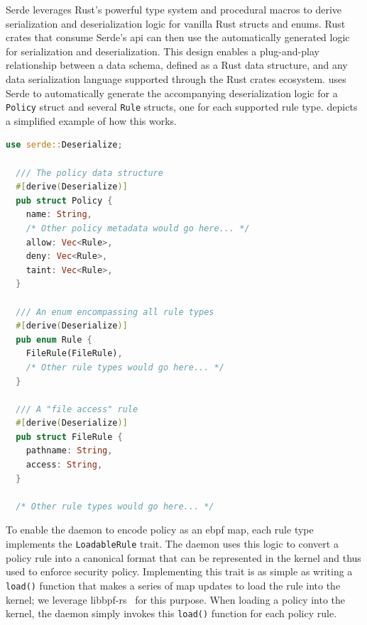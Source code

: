 Serde leverages Rust's powerful type system and procedural macros to derive serialization
and deserialization logic for vanilla Rust structs and enums. Rust crates that consume
Serde's \gls{api} can then use the automatically generated logic for serialization and
deserialization. This design enables a plug-and-play relationship between a data schema,
defined as a Rust data structure, and any data serialization language supported through the
Rust crates ecosystem. \bpfcontain{} uses Serde to automatically generate the accompanying
deserialization logic for a \texttt{Policy} struct and several \texttt{Rule} structs, one
for each supported rule type.  depicts a simplified example of
how this works.

\begin{lstlisting}[language=Rust, gobble=2, caption={[A simplified example of \bpfcontain{}'s policy deserialization logic]
  A simplified example of \bpfcontain{}'s policy deserialization logic. Policy rules are
  specified declaratively using Rust structs and the corresponding deserialization logic
  is automatically generated by the Serde crate using a simple decorator macro.
},
label={lst:bpfcontain-serde}]
  use serde::Deserialize;

  /// The policy data structure
  #[derive(Deserialize)]
  pub struct Policy {
    name: String,
    /* Other policy metadata would go here... */
    allow: Vec<Rule>,
    deny: Vec<Rule>,
    taint: Vec<Rule>,
  }

  /// An enum encompassing all rule types
  #[derive(Deserialize)]
  pub enum Rule {
    FileRule(FileRule),
    /* Other rule types would go here... */
  }

  /// A "file access" rule
  #[derive(Deserialize)]
  pub struct FileRule {
    pathname: String,
    access: String,
  }

  /* Other rule types would go here... */
\end{lstlisting}

To enable the daemon to encode policy as an \gls{ebpf} map, each rule type implements the
\texttt{LoadableRule} trait. The daemon uses this logic to convert a policy rule into
a canonical format that can be represented in the kernel and thus used to enforce security
policy. Implementing this trait is as simple as writing a \texttt{load()} function that
makes a series of map updates to load the rule into the kernel; we leverage
libbpf-rs~\cite{libbpf-rs} for this purpose. When loading a policy into the kernel, the
daemon simply invokes this \texttt{load()} function for each policy rule.


